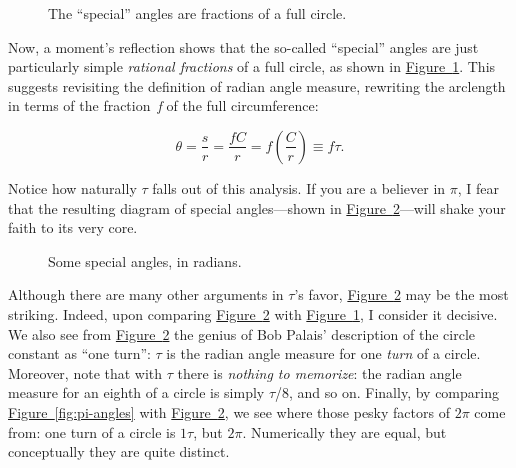 \documentclass{article}
\begin{document}
\begin{figure}
\begin{center}
\end{center}
\caption{The ``special'' angles are fractions of a full circle.\label{fig:angle-fractions}}
\end{figure}

\noindent Now, a moment's reflection shows that the so-called ``special'' angles are just particularly simple \emph{rational fractions} of a full circle, as shown in \hyperref[fig:angle-fractions]{Figure~}\ref{fig:angle-fractions}. This suggests revisiting the definition of radian angle measure, rewriting the arclength in terms of the fraction~\emph{f} of the full circumference:

\[ \theta = \frac{s}{r} = \frac{fC}{r} =  f\left(\frac{C}{r}\right) \equiv f\tau. \]

\noindent Notice how naturally $\tau$ falls out of this analysis. If you are a believer in $\pi$, I fear that the resulting diagram of special angles---shown in \hyperref[fig:tau-angles]{Figure~}\ref{fig:tau-angles}---will shake your faith to its very core. 

\begin{figure}
\begin{center}
\end{center}
\caption{Some special angles, in radians.\label{fig:tau-angles}}
\end{figure}

Although there are many other arguments in $\tau$'s favor, \hyperref[fig:tau-angles]{Figure~}\ref{fig:tau-angles} may be the most striking. Indeed, upon comparing \hyperref[fig:tau-angles]{Figure~}\ref{fig:tau-angles} with \hyperref[fig:angle-fractions]{Figure~}\ref{fig:angle-fractions}, I consider it decisive. We also see from \hyperref[fig:tau-angles]{Figure~}\ref{fig:tau-angles} the genius of Bob Palais' description of the circle constant as ``one turn'': $\tau$ is the radian angle measure for one \emph{turn} of a circle. Moreover, note that with $\tau$ there is \emph{nothing to memorize}: the radian angle measure for an eighth of a circle is simply $\tau$/8, and so on. Finally, by comparing \hyperref[fig:pi-angles]{Figure~}\ref{fig:pi-angles} with \hyperref[fig:tau-angles]{Figure~}\ref{fig:tau-angles}, we see where those pesky factors of $2\pi$ come from: one turn of a circle is $1\tau$, but $2\pi$. Numerically they are equal, but conceptually they are quite distinct.
\end{document}
